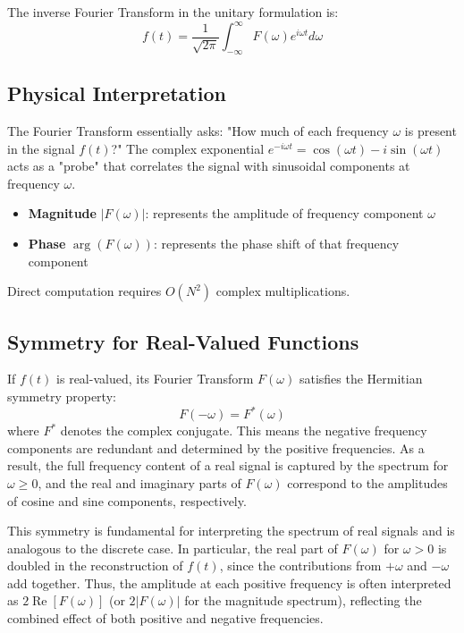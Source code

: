 \documentclass[11pt,a4paper]{article}
\begin{document}
The inverse Fourier Transform in the unitary formulation is:
\begin{equation}
f(t) = \frac{1}{\sqrt{2\pi}} \int_{-\infty}^{\infty} F(\omega) e^{i\omega t} d\omega
\end{equation}


\subsection{Physical Interpretation}

The Fourier Transform essentially asks: "How much of each frequency $\omega$ is present in the signal $f(t)$?" The complex exponential $e^{-i\omega t} = \cos(\omega t) - i\sin(\omega t)$ acts as a "probe" that correlates the signal with sinusoidal components at frequency $\omega$.

\begin{itemize}
    \item \textbf{Magnitude} $|F(\omega)|$: represents the amplitude of frequency component $\omega$
    \item \textbf{Phase} $\arg(F(\omega))$: represents the phase shift of that frequency component
\end{itemize}
Direct computation requires $O(N^2)$ complex multiplications.
\subsection{Symmetry for Real-Valued Functions}

If $f(t)$ is real-valued, its Fourier Transform $F(\omega)$ satisfies the Hermitian symmetry property:
\begin{equation}
F(-\omega) = F^*(\omega)
\end{equation}
where $F^*$ denotes the complex conjugate. This means the negative frequency components are redundant and determined by the positive frequencies. As a result, the full frequency content of a real signal is captured by the spectrum for $\omega \geq 0$, and the real and imaginary parts of $F(\omega)$ correspond to the amplitudes of cosine and sine components, respectively.

This symmetry is fundamental for interpreting the spectrum of real signals and is analogous to the discrete case. In particular, the real part of $F(\omega)$ for $\omega > 0$ is doubled in the reconstruction of $f(t)$, since the contributions from $+\omega$ and $-\omega$ add together. Thus, the amplitude at each positive frequency is often interpreted as $2\operatorname{Re}[F(\omega)]$ (or $2|F(\omega)|$ for the magnitude spectrum), reflecting the combined effect of both positive and negative frequencies.
\end{document}
